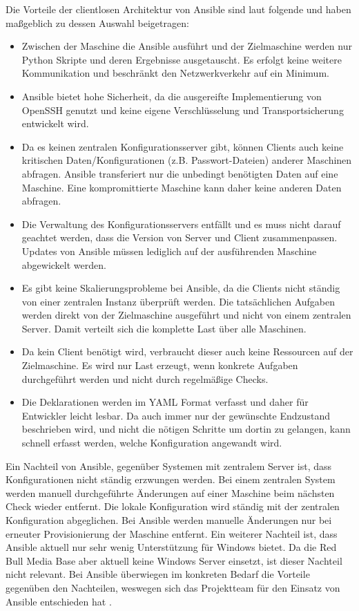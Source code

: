 Die Vorteile der clientlosen Architektur von Ansible sind laut \cite{ansible2014} folgende und haben maßgeblich zu dessen Auswahl beigetragen:
\begin{itemize}
	\item Zwischen der Maschine die Ansible ausführt und der Zielmaschine werden nur Python Skripte und deren Ergebnisse ausgetauscht. Es erfolgt keine weitere Kommunikation und beschränkt den Netzwerkverkehr auf ein Minimum.
	\item Ansible bietet hohe Sicherheit, da die ausgereifte Implementierung von OpenSSH genutzt und keine eigene Verschlüsselung und Transportsicherung entwickelt wird.
	\item Da es keinen zentralen Konfigurationsserver gibt, können Clients auch keine kritischen Daten/Konfigurationen (z.B. Passwort-Dateien) anderer Maschinen abfragen. Ansible transferiert nur die unbedingt benötigten Daten auf eine Maschine. Eine kompromittierte Maschine kann daher keine anderen Daten abfragen.
	\item Die Verwaltung des Konfigurationsservers entfällt und es muss nicht darauf geachtet werden, dass die Version von Server und Client zusammenpassen. Updates von Ansible müssen lediglich auf der ausführenden Maschine abgewickelt werden.
	\item Es gibt keine Skalierungsprobleme bei Ansible, da die Clients nicht ständig von einer zentralen Instanz überprüft werden. Die tatsächlichen Aufgaben werden direkt von der Zielmaschine ausgeführt und nicht von einem zentralen Server. Damit verteilt sich die komplette Last über alle Maschinen.
	\item Da kein Client benötigt wird, verbraucht dieser auch keine Ressourcen auf der Zielmaschine. Es wird nur Last erzeugt, wenn konkrete Aufgaben durchgeführt werden und nicht durch regelmäßige Checks.
	\item Die Deklarationen werden im YAML Format verfasst und daher für Entwickler leicht lesbar. Da auch immer nur der gewünschte Endzustand beschrieben wird, und nicht die nötigen Schritte um dortin zu gelangen, kann schnell erfasst werden, welche Konfiguration angewandt wird. 
\end{itemize}

Ein Nachteil von Ansible, gegenüber Systemen mit zentralem Server ist, dass Konfigurationen nicht ständig erzwungen werden. Bei einem zentralen System werden  manuell durchgeführte Änderungen auf einer Maschine beim nächsten Check wieder entfernt. Die lokale Konfiguration wird ständig mit der zentralen Konfiguration abgeglichen. Bei Ansible werden manuelle Änderungen nur bei erneuter Provisionierung der Maschine entfernt. Ein weiterer Nachteil ist, dass Ansible aktuell nur sehr wenig Unterstützung für Windows bietet. Da die Red Bull Media Base aber aktuell keine Windows Server einsetzt, ist dieser Nachteil nicht relevant. Bei Ansible überwiegen im konkreten Bedarf die Vorteile gegenüben den Nachteilen, weswegen sich das Projektteam für den Einsatz von Ansible entschieden hat \cite{hall2013}.

